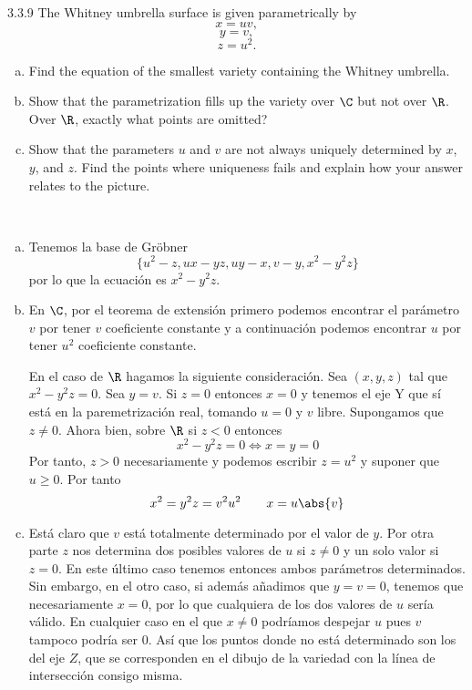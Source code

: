 \documentclass[twoside]{article}
\begin{document}
\begin{ejercicio}{3.3.9}
The Whitney umbrella surface is given parametrically by
\[x = uv,\]
\[y = v,\]
\[z = u^2.\]
\begin{enumerate}[a.]
\item Find the equation of the smallest variety containing the Whitney umbrella.
\item Show that the parametrization fills up the variety over $\C$ but not over $\R$. Over $\R$,
exactly what points are omitted?
\item Show that the parameters $u$ and $v$ are not always uniquely determined by $x$, $y$, and $z$.
Find the points where uniqueness fails and explain how your answer relates to the
picture.
\end{enumerate}
\end{ejercicio}
\begin{solucion}\
\begin{enumerate}[a.]
\item Tenemos la base de Gröbner 
\[
\{u^2 - z, ux - yz, uy - x, v - y, x^2 - y^2z\}
\]
por lo que la ecuación es $x^2-y^2z$. 
\item En $\C$, por el teorema de extensión primero podemos encontrar el parámetro $v$ por tener $v$ coeficiente constante y a continuación podemos encontrar $u$ por tener $u^2$ coeficiente constante. 

En el caso de $\R$ hagamos la siguiente consideración. Sea $(x,y,z)$ tal que $x^2-y^2z=0$. Sea $y=v$. Si $z=0$ entonces $x=0$ y tenemos el eje Y que sí está en la paremetrización real, tomando $u=0$ y $v$ libre. Supongamos que $z\neq 0$. Ahora bien, sobre $\R$ si $z<0$ entonces 
$$x^2-y^2z = 0 \Leftrightarrow x= y =0$$
Por tanto, $z>0$ necesariamente y podemos escribir $z=u^2$ y suponer que $u\geq 0$. Por tanto
$$
x^2 = y^2z = v^2u^2 \qquad x = u\abs{v}
$$
\item Está claro que $v$ está totalmente determinado por el valor de $y$. Por otra parte $z$ nos determina dos posibles valores de $u$ si $z\neq 0$ y un solo valor si $z=0$. En este último caso tenemos entonces ambos parámetros determinados. Sin embargo, en el otro caso, si además añadimos que $y=v=0$, tenemos que necesariamente $x=0$, por lo que cualquiera de los dos valores de $u$ sería válido. En cualquier caso en el que $x\neq 0$ podríamos despejar $u$ pues $v$ tampoco podría ser 0. Así que los puntos donde no está determinado son los del eje $Z$, que se corresponden en el dibujo de la variedad con la línea de intersección consigo misma. 
\end{enumerate}
\end{solucion}
\end{document}
